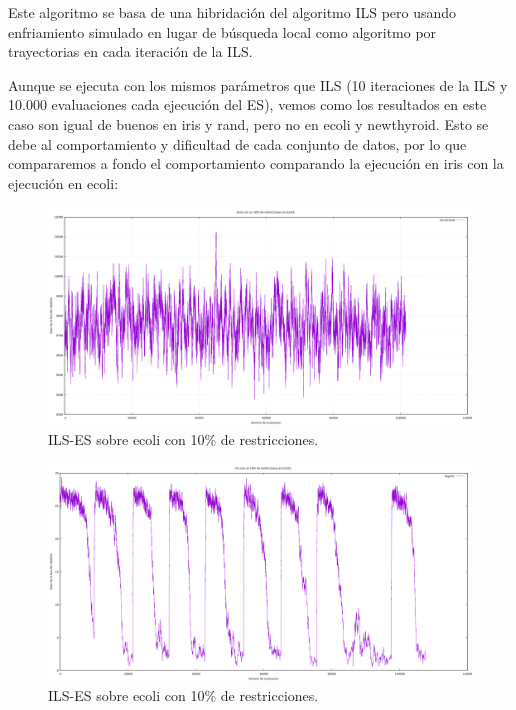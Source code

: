 \documentclass[12pt, spanish]{article}
\begin{document}
Este algoritmo se basa de una hibridación del algoritmo ILS pero usando enfriamiento simulado en lugar de búsqueda local como algoritmo por trayectorias en cada iteración de la ILS. 

Aunque se ejecuta con los mismos parámetros que ILS (10 iteraciones de la ILS y 10.000 evaluaciones cada ejecución del ES), vemos como los resultados en este caso son igual de buenos en iris y rand, pero no en ecoli y newthyroid. Esto se debe al comportamiento y dificultad de cada conjunto de datos, por lo que compararemos a fondo el comportamiento comparando la ejecución en iris con la ejecución en ecoli:


\begin{figure}[H]
	\centering
	\includegraphics[scale = 0.35]{ecoli-ils-es.png}
	
	\caption{ILS-ES sobre ecoli con 10\% de restricciones.}
	\label{fig:ils-es-cmp2}
\end{figure}

\begin{figure}[H]
	\centering
	\includegraphics[scale = 0.35]{iris-ils-es.png}
	
	\caption{ILS-ES sobre ecoli con 10\% de restricciones.}
	\label{fig:ils-es-cmp1}
\end{figure}
\end{document}
